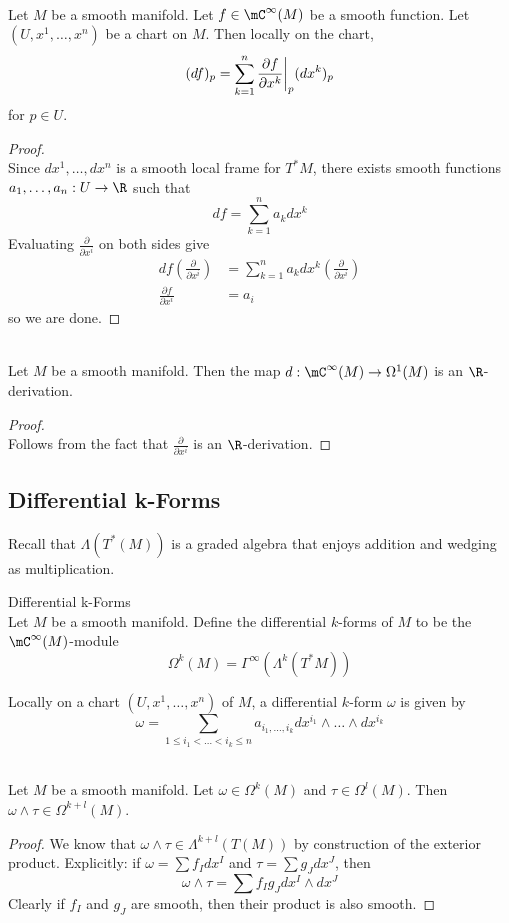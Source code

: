 \documentclass[a4paper]{article}
\begin{document}
\begin{prp}{}{}\\
Let $M$ be a smooth manifold. Let $f\in\mC^\infty(M)$ be a smooth function. Let $(U,x^1,\dots,x^n)$ be a chart on $M$. Then locally on the chart, $$(df)_p=\sum_{k=1}^n\frac{\partial f}{\partial x^k}\bigg{|}_p(dx^k)_p$$ for $p\in U$. 
\begin{proof}\\
Since $dx^1,\dots,dx^n$ is a smooth local frame for $T^\ast M$, there exists smooth functions $a_1,\dots,a_n:U\to\R$ such that $$df=\sum_{k=1}^na_kdx^k$$ Evaluating $\frac{\partial}{\partial x^i}$ on both sides give 
\begin{align*}
df\left(\frac{\partial}{\partial x^i}\right)&=\sum_{k=1}^na_kdx^k\left(\frac{\partial}{\partial x^i}\right)\\
\frac{\partial f}{\partial x^i}&=a_i
\end{align*}
so we are done. 
\end{proof}
\end{prp}

\begin{lmm}{}{}\\
Let $M$ be a smooth manifold. Then the map $d:\mC^\infty(M)\to\Omega^1(M)$ is an $\R$-derivation. 
\begin{proof}\\
Follows from the fact that $\frac{\partial}{\partial x^i}$ is an $\R$-derivation. 
\end{proof}
\end{lmm}

\subsection{Differential k-Forms}
Recall that $\Lambda(T^\ast(M))$ is a graded algebra that enjoys addition and wedging as multiplication. 

\begin{defn}{Differential k-Forms}{}\\
Let $M$ be a smooth manifold. Define the differential $k$-forms of $M$ to be the $\mC^\infty(M)$-module $$\Omega^k(M)=\Gamma^\infty(\Lambda^k(T^\ast M))$$
\end{defn}

Locally on a chart $(U,x^1,\dots,x^n)$ of $M$, a differential $k$-form $\omega$ is given by $$\omega=\sum_{1\leq i_1<\dots<i_k\leq n}a_{i_1,\dots,i_k}dx^{i_1}\wedge\dots\wedge dx^{i_k}$$

\begin{prp}{}{}\\
Let $M$ be a smooth manifold. Let $\omega\in\Omega^k(M)$ and $\tau\in\Omega^l(M)$. Then $\omega\wedge\tau\in\Omega^{k+l}(M)$. 
\begin{proof}
We know that $\omega\wedge\tau\in\Lambda^{k+l}(T(M))$ by construction of the exterior product. Explicitly: if $\omega=\sum f_Idx^I$ and $\tau=\sum g_Jdx^J$, then $$\omega\wedge\tau=\sum f_Ig_Jdx^I\wedge dx^J$$ Clearly if $f_I$ and $g_J$ are smooth, then their product is also smooth. 
\end{proof}
\end{prp}
\end{document}

